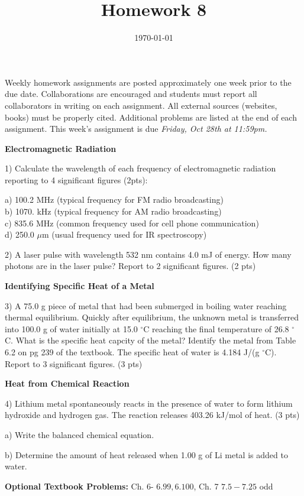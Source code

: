\documentclass[12pt]{article}
\title{\textbf{Homework 8}}
\date{\vspace{-2em}\today}
\begin{document}
\maketitle 

Weekly homework assignments are posted approximately one week prior to the
due date. Collaborations are encouraged and students must report all collaborators
in writing on each assignment. All external sources (websites, books) must be
properly cited. Additional problems are listed at the end of each assignment.
This week's assignment is due \textit{Friday, Oct 28th at 11:59pm.}

\textbf{Electromagnetic Radiation}

1) Calculate the wavelength of each frequency of electromagnetic radiation reporting
to 4 significant figures (2pts):

a) 100.2 MHz (typical frequency for FM radio broadcasting) \\
b) 1070. kHz (typical frequency for AM radio broadcasting) \\
c) 835.6 MHz (common frequency used for cell phone communication) \\
d) 250.0 $\mu$m (usual frequency used for IR spectroscopy)

\vspace{2in}

2) A laser pulse with wavelength 532 nm contains 4.0 mJ of energy. How many photons
are in the laser pulse? Report to 2 significant figures. (2 pts)

\vspace{2in}

\textbf{Identifying Specific Heat of a Metal}

3) A 75.0 g piece of metal that had been submerged in boiling water reaching thermal
equilibrium. Quickly after equilibrium, the unknown metal is transferred into 100.0 g
of water initially at 15.0 $^\circ$C reaching the final temperature of 26.8 $^\circ$C.
What is the specific heat capcity of the metal? Identify the metal from Table 6.2 on
pg 239 of the textbook. The specific heat of water is 4.184 J/(g $^\circ$C). Report to 3
significant figures. (3 pts)

\vspace{2.5in}

\textbf{Heat from Chemical Reaction}

4) Lithium metal spontaneously reacts in the presence of water to form lithium
hydroxide and hydrogen gas. The reaction releases 403.26 kJ/mol of heat. (3 pts)

a) Write the balanced chemical equation.

b) Determine the amount of heat released when 1.00 g of Li metal is added to water.

\vfill

\textbf{Optional Textbook Problems:} Ch. 6- $6.99, 6.100$, Ch. 7 $7.5-7.25$ odd
\end{document}
